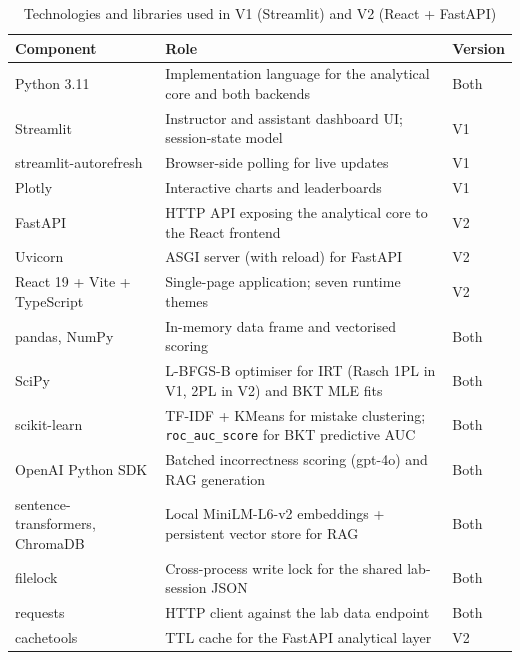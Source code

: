 \begin{table}[H]
    \centering
    \begin{tabular}{|p{}|p{}|p{}|}
    \hline
    \textbf{Component} & \textbf{Role} & \textbf{Version} \\
    \hline
    \hline
    Python 3.11 & Implementation language for the analytical core and both backends & Both \\
    \hline
    Streamlit & Instructor and assistant dashboard UI; session-state model & V1 \\
    \hline
    streamlit-autorefresh & Browser-side polling for live updates & V1 \\
    \hline
    Plotly & Interactive charts and leaderboards & V1 \\
    \hline
    FastAPI & HTTP API exposing the analytical core to the React frontend & V2 \\
    \hline
    Uvicorn & ASGI server (with reload) for FastAPI & V2 \\
    \hline
    React 19 + Vite + TypeScript & Single-page application; seven runtime themes & V2 \\
    \hline
    pandas, NumPy & In-memory data frame and vectorised scoring & Both \\
    \hline
    SciPy & L-BFGS-B optimiser for IRT (Rasch 1PL in V1, 2PL in V2) and BKT MLE fits & Both \\
    \hline
    scikit-learn~\cite{pedregosaScikitlearnMachineLearning2012} & TF-IDF + KMeans for mistake clustering; \texttt{roc\_auc\_score} for BKT predictive AUC & Both \\
    \hline
    OpenAI Python SDK & Batched incorrectness scoring (gpt-4o) and RAG generation & Both \\
    \hline
    sentence-transformers, ChromaDB & Local MiniLM-L6-v2 embeddings + persistent vector store for RAG & Both \\
    \hline
    filelock & Cross-process write lock for the shared lab-session JSON & Both \\
    \hline
    requests & HTTP client against the lab data endpoint & Both \\
    \hline
    cachetools & TTL cache for the FastAPI analytical layer & V2 \\
    \hline
    \end{tabular}
    \caption{Technologies and libraries used in V1 (Streamlit) and V2 (React + FastAPI)}
    \label{tab:techstack-v2}
\end{table}

